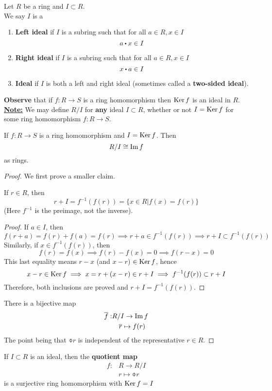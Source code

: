 \documentclass[../Main.tex]{subfiles}
\begin{document}
\begin{dfn}[title=Ideal]
	Let $R$ be a ring and $I\subset R$.\\
	We say $I$ is a 
	\begin{enumerate}[label=(\roman*)]
		\item \textbf{Left ideal} if $I$ is a subring such that for all $a\in R, x\in I$
		\[a\rdot x \in I\]
		\item \textbf{Right ideal} if $I$ is a subring such that for all $a\in R, x\in I$
		\[x\rdot a \in I\]
		\item \textbf{Ideal} if $I$ is both a left and right ideal (sometimes called a \textbf{two-sided ideal}).
	\end{enumerate}
\end{dfn}
\textbf{Observe} that if $f:R\to S$ is a ring homomorphism then $\operatorname{Ker} f$ is an ideal in $R$.\\
\underline{\textbf{Note:}} We may define $R/I$ for \textbf{any} ideal $I\subset R$, whether or not $I=\operatorname{Ker} f$ for some ring homomorphism $f:R\to S$.
\newpage
\begin{thm}[title = The First Isomorphism Theorem]
	If $f:R\to S$ is a ring homomorphism and $I=\operatorname{Ker} f$. Then
	\[R/I\cong \operatorname{Im} f\]
	as rings.
\end{thm}
\begin{proof}
	We first prove a smaller claim.
	\begin{claim}
		If $r \in R$, then  \[r+I = f^{-1}(f(r)) =\{x\in R|f(x)=f(r)\}\]
	(Here $f^{-1}$ is the preimage, not the inverse).
	\end{claim}
	\begin{proof}
		If $a\in I$, then 
		\[f(r+a)=f(r)+f(a)=f(r) \implies r+a \in f^{-1}(f(r)) \implies r+I \subset f^{-1}(f(r))\]
		Similarly, if $x\in f^{-1}(f(r))$, then
		\[f(r)=f(x)\implies f(r)-f(x)=0\implies f(r-x)=0\]
		This last equality means $r-x$ (and $x-r$) $\in \operatorname{Ker} f$, hence
		\[x-r\in \operatorname{Ker} f \implies x = r+(x-r)\in r+I \implies
		f^{-1}(f(r)) \subset r+I \]
		Therefore, both inclusions are proved and $r+I =f^{-1}(f(r))$.
	\end{proof}
	There is a bijective map
	\begin{align*}
		\overline{f}:& R/I \to \operatorname{Im} f \\
		&\quad \overline{r} \mapsto f(r)
	\end{align*}
	The point being that $\obar{r}$ is independent of the representative $r\in R$.
\end{proof}
\begin{thm}
	If $I\subset R$ is an ideal, then the \textbf{quotient map}
	\begin{align*}
		f:&R \to R/I\\
		&r\mapsto \obar{r}
	\end{align*}
	is a surjective ring homomorphism with $\operatorname{Ker} f = I$
\end{thm}
\end{document}
